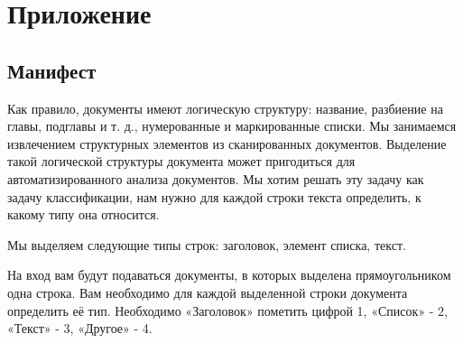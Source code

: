 \documentclass[a4paper,12pt]{article}
\begin{document}
\newpage
\section{Приложение}

\subsection{Манифест}


Как правило, документы имеют логическую структуру: название, разбиение на главы, подглавы и т. д., нумерованные и маркированные списки. Мы занимаемся извлечением структурных элементов из сканированных документов. Выделение такой логической структуры документа может пригодиться для автоматизированного анализа документов. Мы хотим решать эту задачу как задачу классификации, нам нужно для каждой строки текста определить, к какому типу она относится.

Мы выделяем следующие типы строк: заголовок, элемент списка, текст.

На вход вам будут подаваться документы, в которых выделена прямоугольником одна строка. Вам необходимо для каждой выделенной строки документа определить её тип. Необходимо «Заголовок» пометить цифрой 1, «Список» - 2, «Текст» - 3, «Другое» - 4.
\end{document}
